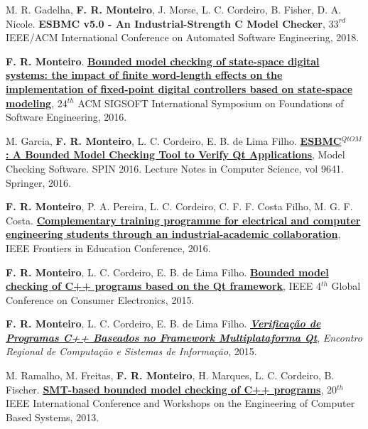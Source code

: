 \documentclass[letterpaper]{article}
\renewenvironment{itemize}{
  \begin{list}{}{
    \setlength{\leftmargin}{1.5em}
  }
}{
  \end{list}
}
\begin{document}
\begin{itemize}
  
    \item M. R. Gadelha, {\bf F. R. Monteiro}, J. Morse, L. C. Cordeiro, B. Fisher, D. A. Nicole. {\bf ESBMC v5.0 - An Industrial-Strength C Model Checker},
  $33^{rd}$ IEEE/ACM International Conference on Automated Software Engineering, 2018.  
    
    \item {\bf F. R. Monteiro}. \href{http://dl.acm.org/citation.cfm?id=2983979}{{\bf Bounded model checking of state-space digital systems: the impact of finite word-length effects on the implementation of fixed-point digital controllers based on state-space modeling}},
  24$^{th}$ ACM SIGSOFT International Symposium on Foundations of Software Engineering, 2016.
  
  \item M. Garcia, {\bf F. R. Monteiro}, L. C. Cordeiro, E. B. de Lima Filho. \href{http://link.springer.com/chapter/10.1007/978-3-319-32582-8_6}{{\bf ESBMC$^{QtOM}$: A Bounded Model Checking Tool to Verify Qt Applications}},
  Model Checking Software. SPIN 2016. Lecture Notes in Computer Science, vol 9641. Springer, 2016.

  \item {\bf F. R. Monteiro}, P. A. Pereira, L. C. Cordeiro, C. F. F. Costa Filho, M. G. F. Costa. \href{http://ieeexplore.ieee.org/abstract/document/7757421/}{{\bf Complementary training programme for electrical and computer engineering students through an industrial-academic collaboration}},
  IEEE Frontiers in Education Conference, 2016.
  
    \item {\bf F. R. Monteiro}, L. C. Cordeiro, E. B. de Lima Filho. \href{http://ieeexplore.ieee.org/abstract/document/7398699/}{{\bf Bounded model checking of C++ programs based on the Qt framework}},
  IEEE 4$^{th}$ Global Conference on Consumer Electronics, 2015.

    \item {\bf F. R. Monteiro}, L. C. Cordeiro, E. B. de Lima Filho. \href{http://ufam-automation.net/lucascordeiro/images/papers/encosis2015-sousa.pdf}{{\bf {\it Verificação de Programas C++ Baseados no Framework Multiplataforma Qt}}},
  {\it Encontro Regional de Computação e Sistemas de Informação}, 2015.
    
  \item M. Ramalho, M. Freitas, {\bf F. R. Monteiro}, H. Marques, L. C. Cordeiro, B. Fischer. \href{http://ieeexplore.ieee.org/abstract/document/6601583/}{{\bf SMT-based bounded model checking of C++ programs}},
  20$^{th}$ IEEE International Conference and Workshops on the Engineering of Computer Based Systems, 2013.


\end{itemize}
\end{document}
